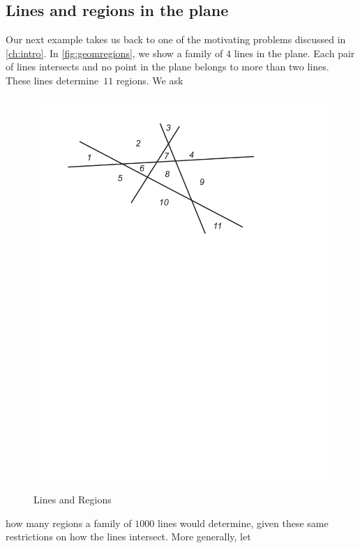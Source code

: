 \subsection{Lines and regions in the plane}\label{s:recurrence:intro:lines}
Our next example takes us back to one of the motivating problems
discussed in \autoref{ch:intro}.  In \autoref{fig:geomregions}, we
show a family of $4$ lines in the plane.  Each pair of lines
intersects and no point in the plane belongs to more than two lines.
These lines determine~$11$ regions.  We ask
 \begin{figure}
 \begin{center}
 \includegraphics[clip,viewport=60 480 470 745,scale=.6]{recurrence-figs/3012-fig9}\\
 \caption{\label{fig:geomregions}Lines and Regions} 
 \end{center}
 \end{figure}
how many regions a family of $1000$ lines would determine, given
these same restrictions on how the lines intersect.  More generally, let
